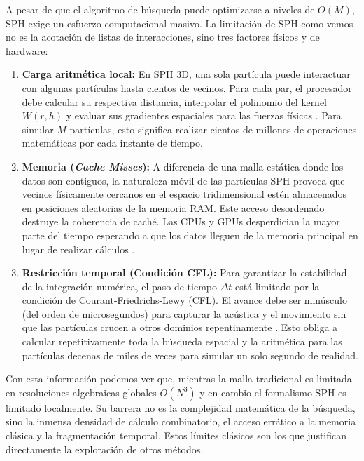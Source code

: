 A pesar de que el algoritmo de búsqueda puede optimizarse a niveles de $O(M)$, SPH exige un esfuerzo computacional masivo. La limitación de SPH como vemos no es la acotación de listas de interacciones, sino tres factores físicos y de hardware:

\begin{enumerate}
    \item \textbf{Carga aritmética local:} En SPH 3D, una sola partícula puede interactuar con algunas partículas hasta cientos de vecinos. Para cada par, el procesador debe calcular su respectiva distancia, interpolar el polinomio del kernel $W(r,h)$ y evaluar sus gradientes espaciales para las fuerzas físicas \cite{liu2003sph}. Para simular $M$ partículas, esto significa realizar cientos de millones de operaciones matemáticas por cada instante de tiempo.
    
    \item \textbf{Memoria (\textit{Cache Misses}):} A diferencia de una malla estática donde los datos son contiguos, la naturaleza móvil de las partículas SPH provoca que vecinos físicamente cercanos en el espacio tridimensional estén almacenados en posiciones aleatorias de la memoria RAM. Este acceso desordenado destruye la coherencia de caché. Las CPUs y GPUs desperdician la mayor parte del tiempo esperando a que los datos lleguen de la memoria principal en lugar de realizar cálculos \cite{Staubach2010SPHSystemSimulation}.
    
    \item \textbf{Restricción temporal (Condición CFL):} Para garantizar la estabilidad de la integración numérica, el paso de tiempo $\Delta t$ está limitado por la condición de Courant-Friedrichs-Lewy (CFL). El avance debe ser minúsculo (del orden de microsegundos) para capturar la acústica y el movimiento sin que las partículas crucen a otros dominios repentinamente \cite{Mocz2020SPH}. Esto obliga a calcular repetitivamente toda la búsqueda espacial y la aritmética para las partículas decenas de miles de veces para simular un solo segundo de realidad.
\end{enumerate}

Con esta información podemos ver que, mientras la malla tradicional es limitada en resoluciones algebraicas globales $O(N^3)$ y en cambio el formalismo SPH es limitado localmente. Su barrera no es la complejidad matemática de la búsqueda, sino la inmensa densidad de cálculo combinatorio, el acceso errático a la memoria clásica y la fragmentación temporal. Estos límites clásicos son los que justifican directamente la exploración de otros métodos.


